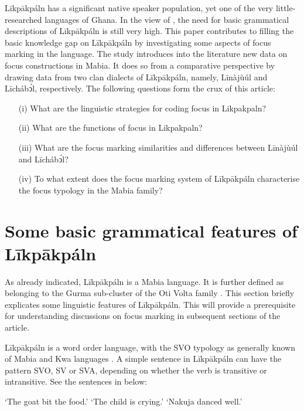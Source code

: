 \documentclass[output=paper,colorlinks,citecolor=brown]{langscibook}
\begin{document}
Līkpākpáln has a significant native speaker population, yet one of the very little-researched languages of Ghana. In the view of \citep{Schwarz2009}, the need for basic grammatical descriptions of Līkpākpáln is still very high. This paper contributes to filling the basic knowledge gap on Līkpākpáln by investigating some aspects of focus marking in the language. The study introduces into the literature new data on focus constructions in Mabia. It does so from a comparative perspective by drawing data from two clan dialects of Līkpākpáln, namely, Līnàjùúl and Līchábͻ́l, respectively. The following questions form the crux of this article:

\begin{itemize}
    \item[(i)]      What are the linguistic strategies for coding focus in Likpakpaln?
    \item[(ii)]     What are the functions of focus in Likpakpaln?
    \item[(iii)]    What are the focus marking similarities and differences between Līnàjùúl and Līchábͻ́l?
    \item[(iv)]     To what extent does the focus marking system of Līkpākpáln characterise the focus typology in the Mabia family?
\end{itemize}

\section{Some basic grammatical features of Līkpākpáln}\label{sec:bisilki:2}

As already indicated, Līkpākpáln is a Mabia language. It is further defined as belonging to the Gurma sub-cluster of the Oti Volta family \citep{Naden1988, SteeleWeed1966}. This section briefly explicates some linguistic features of Līkpākpáln. This will provide a prerequisite for understanding discussions on focus marking in subsequent sections of the article.

Līkpākpáln is a word order language, with the SVO typology as generally known of Mabia and Kwa languages \citep{Schwarz2009}. A simple sentence in Līkpākpáln can have the pattern SVO, SV or SVA, depending on whether the verb is transitive or intransitive. See the sentences in  below:

\ea%
    \label{ex:bisilki:1}
    \jambox*{[SVO]}
    \glt    ‘The goat bit the food.’
    \jambox*{[SV]}
	\glt    ‘The child is crying.’
    \jambox*{[SVA]}
    \glt    ‘Nakuja danced well.’
    \z
\z
\end{document}
